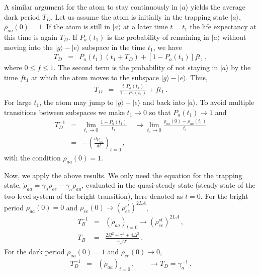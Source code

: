 \documentclass[twocolumn,aps,eqsecnum,showkeys,amsmath]{revtex4-2}
\begin{document}
A similar argument for the atom to stay continuously in $| a \rangle$ yields 
the average dark period $T_D$. Let us assume the atom is initially in the 
trapping state $| a \rangle$, $\rho_{aa}(0)=1$. If the atom is still in 
$| a \rangle$ at a later time $t=t_1$ the life expectancy at this time is again 
$T_D$. If $P_{a}(t_1)$ is the probability of remaining in $| a \rangle$ 
without moving into the $| g \rangle - | e \rangle$ subspace in the time 
$t_1$, we have  
%
\begin{eqnarray}
T_D &=& P_{a}(t_1) (t_1+ T_D) +[1- P_{a}(t_1)] f t_1 \,, 
\end{eqnarray}
where $0 \leq f \leq 1$. The second term is the probability of not staying 
in $| a \rangle$ by the time $f t_1$ at which the atom moves to the 
subspace $| g \rangle - | e \rangle$. Thus, 
%
\begin{eqnarray}
T_D &=& \frac{t_1 P_{a}(t_1)}{ 1- P_{a}(t_1) } +f t_1  	\,.
\end{eqnarray}
For large $t_1$, the atom may jump to $| g \rangle - | e \rangle$ and 
back into $| a \rangle$. To avoid multiple transitions between subspaces 
we make $t_1 \to 0$ so that $P_{a} (t_1) \to 1$ and 
%
\begin{eqnarray}
T_D^{-1} &=& \lim_{t_1 \to 0} \frac{ 1- P_a (t_1) }{t_1} 		\quad \to 
 	\lim_{t_1 \to 0} \frac{ \rho_{aa} (0) - \rho_{aa} (t_1) }{t_1} 	\nonumber \\
&=& - \left( \frac{ d \rho_{aa} }{dt} \right)_{t=0} \,,
\end{eqnarray}
with the condition $\rho_{aa}(0) =1$. 

Now, we apply the above results. We only need the equation for the trapping 
state, $\dot{\rho}_{aa} = \gamma_d \rho_{ee} -\gamma_a \rho_{aa}$, 
evaluated in the quasi-steady state (steady state of the two-level system of 
the bright transition), here denoted as $t=0$. For the bright period 
$\rho_{aa}(0) =0$ and $\rho_{ee}(0) \to (\rho_{ee}^{st})^{2LA}$, 
%
\begin{eqnarray}    
T_B^{-1} &=& (\dot{\rho}_{aa})_{t=0} 	\to (\rho_{ee}^{st})^{2LA} \,, \nonumber  \\  
T_B &=& \frac{2\Omega^2 +\gamma^2 +4\Delta^2}{\gamma_d \Omega^2} \,. 
\end{eqnarray}
For the dark period $\rho_{aa}(0) =1$ and $\rho_{ee}(0) \to 0$,
%
\begin{eqnarray}    
T_D^{-1} &=& (\dot{\rho}_{aa})_{t=0} \,, 	\qquad \to 
	T_D = \gamma_a^{-1} \,.
\end{eqnarray}
\end{document}
